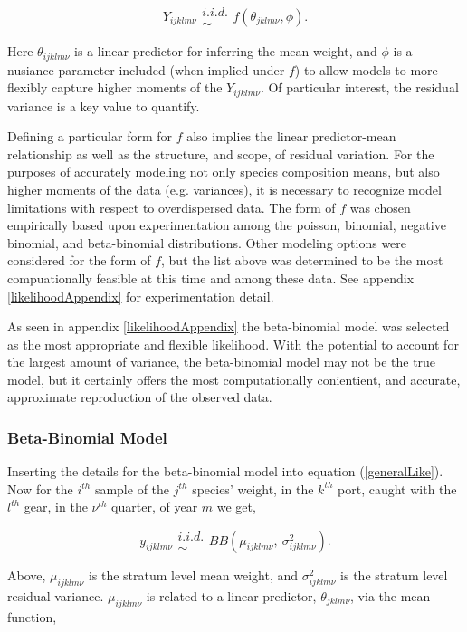 \documentclass[12pt]{article}
\begin{document}
\begin{equation}
Y_{ijklm\nu} \substack{i.i.d.\\\sim} f(\theta_{jklm\nu}, \phi).
\label{generalLike}
\end{equation}

%
Here $\theta_{ijklm\nu}$ is a linear predictor for inferring the mean weight, 
and $\phi$ is a nusiance parameter included (when implied under $f$) to allow 
models to more flexibly capture higher moments of the \(Y_{ijklm\nu}\). Of 
particular interest, the residual variance is a key value to quantify.

%
Defining a particular form for $f$ also implies the linear predictor-mean 
relationship as well as the structure, and scope, of residual variation. For 
the purposes of accurately modeling not only species composition means, but 
also higher moments of the data (e.g. variances), it is necessary to recognize 
model limitations with respect to overdispersed data. The form of $f$ was 
chosen empirically based upon experimentation among the poisson, binomial, 
negative binomial, and beta-binomial distributions. Other modeling options 
were considered for the form of $f$, but the list above was determined to be 
the most compuationally feasible at this time and among these data. See 
appendix \ref{likelihoodAppendix} for experimentation detail. 

% 
As seen in appendix \ref{likelihoodAppendix} the beta-binomial model was 
selected as the most appropriate and flexible likelihood. With the potential 
to account for the largest amount of variance, the beta-binomial model may 
not be the true model, but it certainly offers the most computationally 
conientient, and accurate, approximate reproduction of the observed data. 

\subsubsection{Beta-Binomial Model}\label{bbModel}

%
Inserting the details for the beta-binomial model into equation 
(\ref{generalLike}). Now for the \(i^{th}\) sample of the \(j^{th}\) species' 
weight, in the \(k^{th}\) port, caught with the \(l^{th}\) gear, in the 
\(\nu^{th}\) quarter, of year \(m\) we get,

\[y_{ijklm\nu} \substack{i.i.d.\\\sim} BB(\mu_{ijklm\nu},~\sigma^2_{ijklm\nu}).\]

Above, \(\mu_{ijklm\nu}\) is the stratum level mean weight, and 
\(\sigma^2_{ijklm\nu}\) is the stratum level residual variance.
\(\mu_{ijklm\nu}\) is related to a linear predictor,
\(\theta_{jklm\nu}\), via the mean function,
\end{document}
